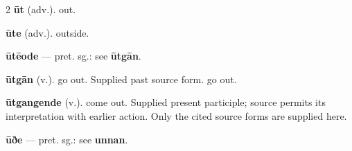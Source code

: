 \begin{multicols*}{2}
\textbf{ūt} (adv.). out.\par
\textbf{ūte} (adv.). outside.\par
\textbf{ūtēode} — pret. sg.: see \textbf{ūtgān}.\par
\textbf{ūtgān} (v.). go out. Supplied past source form. go out.\par
\textbf{ūtgangende} (v.). come out. Supplied present participle; source permits its interpretation with earlier action. Only the cited source forms are supplied here.\par
\textbf{ūðe} — pret. sg.: see \textbf{unnan}.\par

\end{multicols*}

